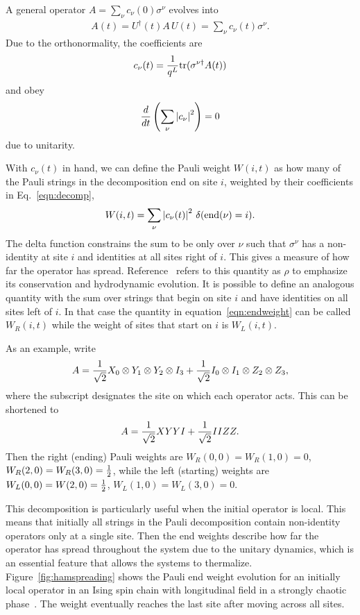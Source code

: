 A general operator $A = \sum_\nu c_{\nu}(0)\sigma^\nu$ evolves into
\begin{align}
A(t) = U^\dag(t)A\,U(t) = \sum_\nu c_\nu(t)\sigma^\nu.\label{eqn:decomp}
\end{align}
Due to the orthonormality, the coefficients are 
\begin{align}
c_\nu(t) = \frac{1}{q^L}\text{tr}(\sigma^{\nu\dag}A(t))
\end{align}
and obey 
\begin{align}
\frac{d}{dt} \left(\sum_\nu \left|c_\nu\right|^2\right) = 0 \nonumber
\end{align}
due to unitarity.

With $c_\nu(t)$ in hand, we can define the Pauli weight $W(i,t)$ as how many of the Pauli strings in the decomposition end on site $i$, weighted by their coefficients in Eq.~\ref{eqn:decomp},
\begin{align}
W(i,t) = \sum_\nu\left|c_\nu(t)\right|^2\,\delta(\text{end}(\nu)=i).
	\label{eqn:endweight}
\end{align}
The delta function constrains the sum to be only over $\nu$ such that $\sigma^\nu$ has a non-identity at site $i$ and identities at all sites right of $i$. This gives a measure of how far the operator has spread. Reference~\cite{Keyserlingk} refers to this quantity as $\rho$ to emphasize its conservation and hydrodynamic evolution. It is possible to define an analogous quantity with the sum over strings that begin on site $i$ and have identities on all sites left of $i$. In that case the quantity in equation~\ref{eqn:endweight} can be called $W_R(i,t)$ while the weight of sites that start on $i$ is $W_L(i,t)$.

As an example, write
\begin{align}
A = \frac{1}{\sqrt{2}} X_0\otimes Y_1\otimes Y_2\otimes I_3 + \frac{1}{\sqrt{2}} I_0\otimes I_1\otimes Z_2\otimes Z_3,
	\nonumber
\end{align}
where the subscript designates the site on which each operator acts. This can be shortened to
\begin{align}
A = \frac{1}{\sqrt{2}} XYYI + \frac{1}{\sqrt{2}} IIZZ\label{eqn:inioper}.
\end{align}
Then the right (ending) Pauli weights are $W_R(0,0) = W_R(1,0) = 0$, $W_R(2,0)= W_R(3,0) =\frac{1}{2}$, while the left (starting) weights are $W_L(0, 0) = W(2,0) =\frac{1}{2}$, $W_L(1,0) = W_L(3,0)=0$.

This decomposition is particularly useful when the initial operator is local. This means that initially all strings in the Pauli decomposition contain non-identity operators only at a single site. Then the end weights describe how far the operator has spread throughout the system due to the unitary dynamics, which is an essential feature that allows the systems to thermalize. Figure~\ref{fig:hamspreading} shows the Pauli end weight evolution for an initially local operator in an Ising spin chain with longitudinal field in a strongly chaotic phase~\cite{Jonay17}. The weight eventually reaches the last site after moving across all sites.

